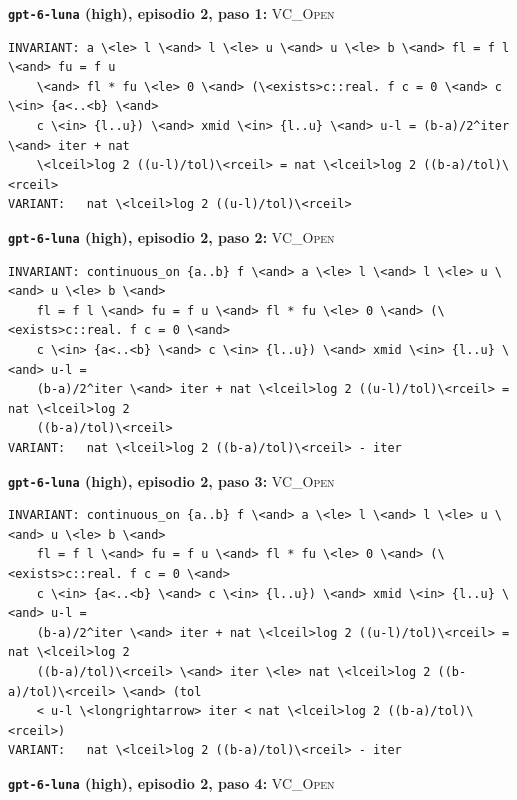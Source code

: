 \par\medskip\noindent\textbf{\texttt{gpt-6-luna} (high), episodio 2, paso 1:} \textsc{VC\_Open}\par\nopagebreak
\begin{lstlisting}
INVARIANT: a \<le> l \<and> l \<le> u \<and> u \<le> b \<and> fl = f l \<and> fu = f u
    \<and> fl * fu \<le> 0 \<and> (\<exists>c::real. f c = 0 \<and> c \<in> {a<..<b} \<and>
    c \<in> {l..u}) \<and> xmid \<in> {l..u} \<and> u-l = (b-a)/2^iter \<and> iter + nat
    \<lceil>log 2 ((u-l)/tol)\<rceil> = nat \<lceil>log 2 ((b-a)/tol)\<rceil>
VARIANT:   nat \<lceil>log 2 ((u-l)/tol)\<rceil>
\end{lstlisting}
\par\medskip\noindent\textbf{\texttt{gpt-6-luna} (high), episodio 2, paso 2:} \textsc{VC\_Open}\par\nopagebreak
\begin{lstlisting}
INVARIANT: continuous_on {a..b} f \<and> a \<le> l \<and> l \<le> u \<and> u \<le> b \<and>
    fl = f l \<and> fu = f u \<and> fl * fu \<le> 0 \<and> (\<exists>c::real. f c = 0 \<and>
    c \<in> {a<..<b} \<and> c \<in> {l..u}) \<and> xmid \<in> {l..u} \<and> u-l =
    (b-a)/2^iter \<and> iter + nat \<lceil>log 2 ((u-l)/tol)\<rceil> = nat \<lceil>log 2
    ((b-a)/tol)\<rceil>
VARIANT:   nat \<lceil>log 2 ((b-a)/tol)\<rceil> - iter
\end{lstlisting}
\par\medskip\noindent\textbf{\texttt{gpt-6-luna} (high), episodio 2, paso 3:} \textsc{VC\_Open}\par\nopagebreak
\begin{lstlisting}
INVARIANT: continuous_on {a..b} f \<and> a \<le> l \<and> l \<le> u \<and> u \<le> b \<and>
    fl = f l \<and> fu = f u \<and> fl * fu \<le> 0 \<and> (\<exists>c::real. f c = 0 \<and>
    c \<in> {a<..<b} \<and> c \<in> {l..u}) \<and> xmid \<in> {l..u} \<and> u-l =
    (b-a)/2^iter \<and> iter + nat \<lceil>log 2 ((u-l)/tol)\<rceil> = nat \<lceil>log 2
    ((b-a)/tol)\<rceil> \<and> iter \<le> nat \<lceil>log 2 ((b-a)/tol)\<rceil> \<and> (tol
    < u-l \<longrightarrow> iter < nat \<lceil>log 2 ((b-a)/tol)\<rceil>)
VARIANT:   nat \<lceil>log 2 ((b-a)/tol)\<rceil> - iter
\end{lstlisting}
\par\medskip\noindent\textbf{\texttt{gpt-6-luna} (high), episodio 2, paso 4:} \textsc{VC\_Open}\par\nopagebreak
